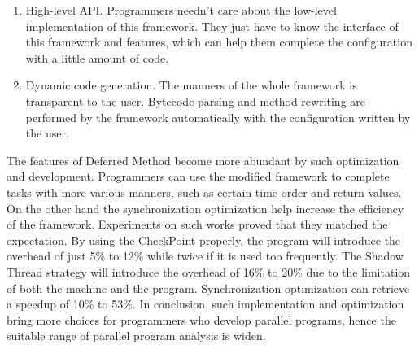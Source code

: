 \begin{englishabstract}
\begin{enumerate}
	\item High-level API. Programmers needn't care about the low-level implementation of this framework. They just have to know the interface of this framework and features, which can help them complete the configuration with a little amount of code.
	\item Dynamic code generation. The manners of the whole framework is transparent to the user. Bytecode parsing and method rewriting are performed by the framework automatically with the configuration written by the user.
\end{enumerate}

The features of Deferred Method become more abundant by such optimization and development. Programmers can use the modified framework to complete tasks with more various manners, such as certain time order and return values. On the other hand the synchronization optimization help increase the efficiency of the framework. Experiments on such works proved that they matched the expectation. By using the CheckPoint properly, the program will introduce the overhead of just 5\% to 12\% while twice if it is used too frequently. The Shadow Thread strategy will introduce the overhead of 16\% to 20\% due to the limitation of both the machine and the program. Synchronization optimization can retrieve a speedup of 10\% to 53\%. In conclusion, such implementation and optimization bring more choices for programmers who develop parallel programs, hence the suitable range of parallel program analysis is widen.

\end{englishabstract}
